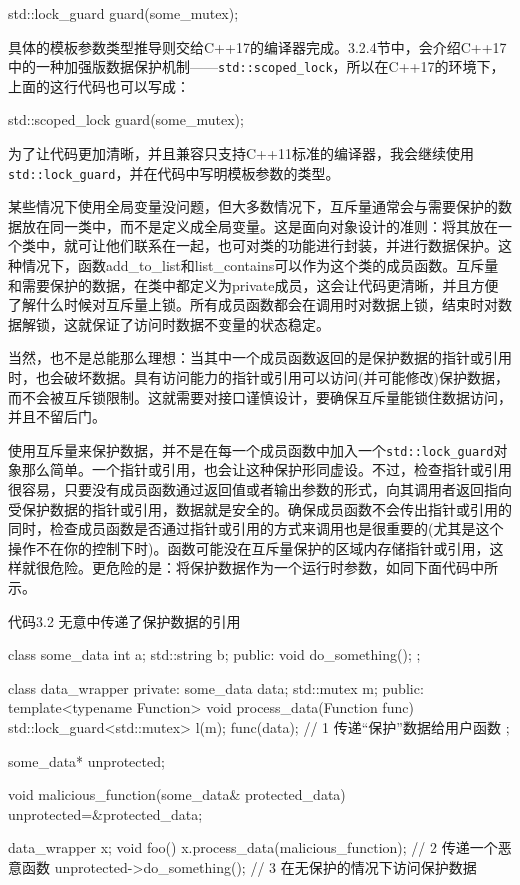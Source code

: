 \begin{cpp}
std::lock_guard guard(some_mutex);
\end{cpp}

具体的模板参数类型推导则交给C++17的编译器完成。3.2.4节中，会介绍C++17中的一种加强版数据保护机制——\texttt{std::scoped\_lock}，所以在C++17的环境下，上面的这行代码也可以写成：

\begin{cpp}
std::scoped_lock guard(some_mutex);
\end{cpp}

为了让代码更加清晰，并且兼容只支持C++11标准的编译器，我会继续使用\texttt{std::lock\_guard}，并在代码中写明模板参数的类型。

某些情况下使用全局变量没问题，但大多数情况下，互斥量通常会与需要保护的数据放在同一类中，而不是定义成全局变量。这是面向对象设计的准则：将其放在一个类中，就可让他们联系在一起，也可对类的功能进行封装，并进行数据保护。这种情况下，函数add\_to\_list和list\_contains可以作为这个类的成员函数。互斥量和需要保护的数据，在类中都定义为private成员，这会让代码更清晰，并且方便了解什么时候对互斥量上锁。所有成员函数都会在调用时对数据上锁，结束时对数据解锁，这就保证了访问时数据不变量的状态稳定。

当然，也不是总能那么理想：当其中一个成员函数返回的是保护数据的指针或引用时，也会破坏数据。具有访问能力的指针或引用可以访问(并可能修改)保护数据，而不会被互斥锁限制。这就需要对接口谨慎设计，要确保互斥量能锁住数据访问，并且不留后门。


使用互斥量来保护数据，并不是在每一个成员函数中加入一个\texttt{std::lock\_guard}对象那么简单。一个指针或引用，也会让这种保护形同虚设。不过，检查指针或引用很容易，只要没有成员函数通过返回值或者输出参数的形式，向其调用者返回指向受保护数据的指针或引用，数据就是安全的。确保成员函数不会传出指针或引用的同时，检查成员函数是否通过指针或引用的方式来调用也是很重要的(尤其是这个操作不在你的控制下时)。函数可能没在互斥量保护的区域内存储指针或引用，这样就很危险。更危险的是：将保护数据作为一个运行时参数，如同下面代码中所示。

代码3.2 无意中传递了保护数据的引用

\begin{cpp}
class some_data
{
  int a;
  std::string b;
public:
  void do_something();
};

class data_wrapper
{
private:
  some_data data;
  std::mutex m;
public:
  template<typename Function>
  void process_data(Function func)
  {
    std::lock_guard<std::mutex> l(m);
    func(data);    // 1 传递“保护”数据给用户函数
  }
};

some_data* unprotected;

void malicious_function(some_data& protected_data)
{
  unprotected=&protected_data;
}

data_wrapper x;
void foo()
{
  x.process_data(malicious_function);    // 2 传递一个恶意函数
  unprotected->do_something();    // 3 在无保护的情况下访问保护数据
}
\end{cpp}

